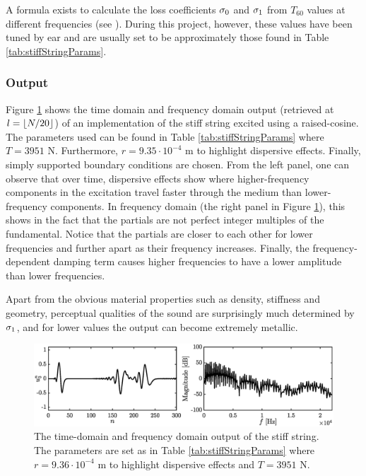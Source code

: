 {\renewcommand{\arraystretch}{1}

A formula exists to calculate the loss coefficients $\sigma_{0}$ and $\sigma_{1}$ from $T_{60}$ values at different frequencies (see \cite[Eq (7.29)]{theBible}). During this project, however, these values have been tuned by ear and are usually set to be approximately those found in Table \ref{tab:stiffStringParams}. 


\subsubsection{Output}
Figure \ref{fig:stiffStringOutput} shows the time domain and frequency domain output (retrieved at $l = \floor[N/20]$) of an implementation of the stiff string excited using a raised-cosine. The parameters used can be found in Table \ref{tab:stiffStringParams} 
where $T = 3951$ N. Furthermore, $r = 9.35\cdot 10^{-4}$ m to highlight dispersive effects. Finally, simply supported boundary conditions are chosen. From the left panel, one can observe that over time, dispersive effects show where higher-frequency components in the excitation travel faster through the medium than lower-frequency components. In frequency domain (the right panel in Figure \ref{fig:stiffStringOutput}), this shows in the fact that the partials are not perfect integer multiples of the fundamental. Notice that the partials are closer to each other for lower frequencies and further apart as their frequency increases. Finally, the frequency-dependent damping term causes higher frequencies to have a lower amplitude than lower frequencies. 

Apart from the obvious material properties such as density, stiffness and geometry, perceptual qualities of the sound are surprisingly much determined by $\sigma_{1}$, and for lower values the output can become extremely metallic.

\begin{figure}[h]
    \includegraphics[width=\textwidth]{figures/resonators/outputFFT.eps}
    \caption{The time-domain and frequency domain output of the stiff string. The parameters are set as in Table \ref{tab:stiffStringParams} where $r = 9.36\cdot 10^{-4}$ m to highlight dispersive effects and $T = 3951$ N. %
    \label{fig:stiffStringOutput}}
\end{figure}


}
